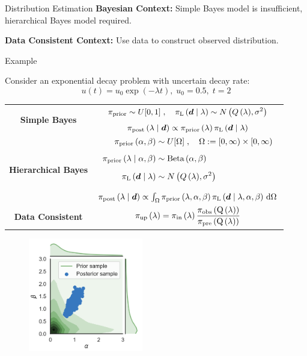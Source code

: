 \begin{block}{Distribution Estimation}
\centering
            {\large \textbf{Bayesian Context:} Simple Bayes model is insufficient, hierarchical Bayes model required.}
           
           {\large \textbf{Data Consistent Context:} Use data to construct observed distribution.}

             
\end{block}


\begin{block}{Example}
\centering


Consider an exponential decay problem with uncertain decay rate:
\begin{equation*}
       u(t) = u_0\exp(-\lambda t), \; u_0 = 0.5 ,\; t=2
   \end{equation*}

\begin{tabular}{c|c}
\hline
\multirow{2}{*}{\vspace{1.5ex}\textbf{Simple Bayes}} & 
$\begin{aligned}\prior \sim U[0,1]\; , \quad  \likelihood\qGivelam\sim N\left(Q\lam,\sigma^2\right) \end{aligned}$ \\[1.25ex]
                                        & $\bayes$ \\
\hline
\multirow{2}{*}{\vspace{2ex} \textbf{Hierarchical Bayes}}   & $\begin{aligned}
        \prior\hyper &\sim U[\Omega]\; , \quad \Omega:=[0,\infty)\times[0,\infty) \\[1.25ex]
        \prior\lamGiveH &\sim \text{Beta}\hyper \\[1.25ex]
        \likelihood\qGivelam &\sim N\left(Q\lam,\sigma^2\right)\\[1.25ex] \end{aligned}$ \\[1.25ex]
                                    & $\Hbayes$ \\
\hline
\textbf{Data Consistent} &  $\dci$ \\
\hline
\end{tabular}

\begin{figure}
        \includegraphics[width=5cm]{figures/distr_EX_hyper_param.png}
        \vspace{-0.5cm}
        \caption{ }
\end{figure}


\end{block}
